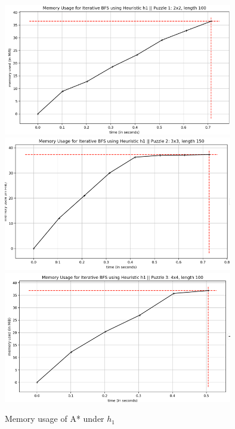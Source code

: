\documentclass[runningheads]{llncs}
\begin{document}
\begin{figure}
    \begin{center}
        \includegraphics[width=10cm]{images/bfs-2x2-h1.png}
        \includegraphics[width=10cm]{images/bfs-3x3-h1.png}
        \includegraphics[width=10cm]{images/bfs-4x4-h1.png}
        \caption{Memory usage of A* under $h_1$} \label{fig2}
    \end{center}
\end{figure}
    
\end{document}
